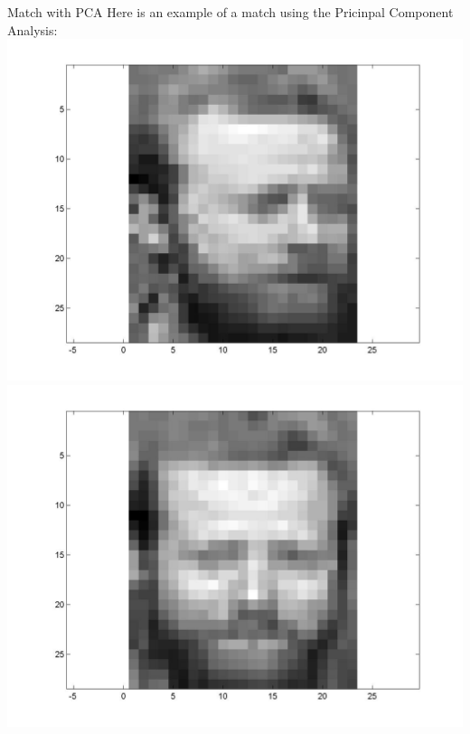 \documentclass[pdf]{beamer}
\begin{document}
\begin{frame}{Match with PCA}
Here is an example of a match using the Pricinpal Component Analysis:
\includegraphics[scale=.13]{figure4}
\includegraphics[scale=.13]{figure5}
\end{frame}
\end{document}
